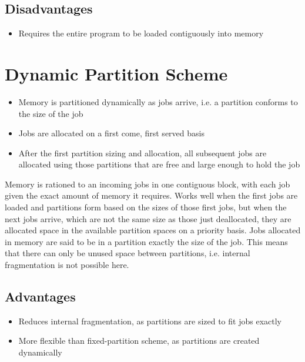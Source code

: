 \documentclass[12pt letter]{report}
\begin{document}
\subsection{Disadvantages}
\begin{itemize}
  \item Requires the entire program to be loaded contiguously into memory
\end{itemize}

\section{Dynamic Partition Scheme}

\begin{itemize}
  \item Memory is partitioned dynamically as jobs arrive, i.e. a partition conforms to the size of the job
  \item Jobs are allocated on a first come, first served basis
  \item After the first partition sizing and allocation, all subsequent jobs are allocated using those partitions that are free and large enough to hold the job
\end{itemize}


Memory is rationed to an incoming jobs in one contiguous block, with each job given the exact amount of memory it requires. Works well when the first jobs are loaded and partitions form based on the sizes of those first jobs, but when the next jobs arrive, which are not the same size as those just deallocated, they are allocated space in the available partition spaces on a priority basis. Jobs allocated in memory are said to be in a partition exactly the size of the job. This means that there can only be unused space between partitions, i.e. internal fragmentation is not possible here.

\subsection{Advantages}
\begin{itemize}
  \item Reduces internal fragmentation, as partitions are sized to fit jobs exactly
  \item More flexible than fixed-partition scheme, as partitions are created dynamically
\end{itemize}
\end{document}
